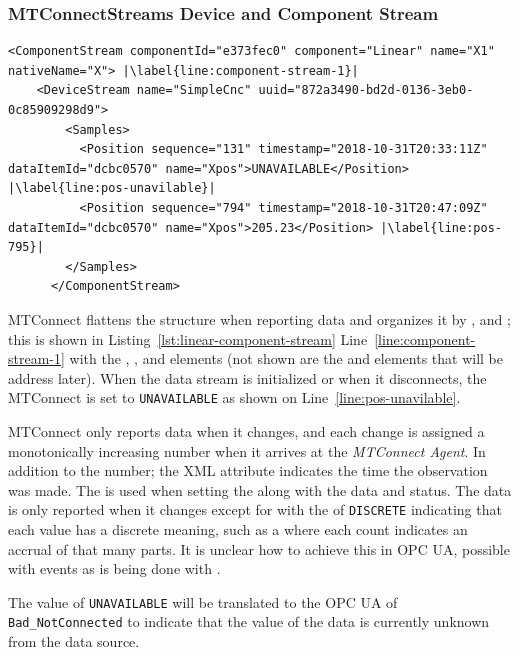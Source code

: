 \subsubsection{MTConnectStreams Device and Component Stream}

\begin{lstlisting}[firstnumber=last,escapechar=|,%
    caption={Component Stream},label={lst:component-stream}]
      <ComponentStream componentId="e373fec0" component="Linear" name="X1" nativeName="X"> |\label{line:component-stream-1}|
    <DeviceStream name="SimpleCnc" uuid="872a3490-bd2d-0136-3eb0-0c85909298d9">    
        <Samples>
          <Position sequence="131" timestamp="2018-10-31T20:33:11Z" dataItemId="dcbc0570" name="Xpos">UNAVAILABLE</Position> |\label{line:pos-unavilable}|
          <Position sequence="794" timestamp="2018-10-31T20:47:09Z" dataItemId="dcbc0570" name="Xpos">205.23</Position> |\label{line:pos-795}|
        </Samples>
      </ComponentStream>
\end{lstlisting}

MTConnect flattens the structure when reporting data and organizes it by ,  and ; this is shown in  Listing~\ref{lst:linear-component-stream} Line~\ref{line:component-stream-1} with the , , and  elements (not shown are the  and  elements that will be address later). When the data stream is initialized or when it disconnects, the MTConnect  is set to \texttt{UNAVAILABLE} as shown on Line~\ref{line:pos-unavilable}.

MTConnect only reports data when it changes, and each change is assigned a monotonically increasing  number when it arrives at the \textit{MTConnect Agent}. In addition to the  number; the XML attribute  indicates the time the observation was made. The  is used when setting the   along with the data and status. The data is only reported when it changes except for  with the  of \texttt{DISCRETE} indicating that each value has a discrete meaning, such as a  where each count indicates an accrual of that many parts. {\color{red} It is unclear how to achieve this in OPC UA, possible with events as is being done with }.

The value of \texttt{UNAVAILABLE} will be translated to the OPC UA   of \texttt{Bad_NotConnected} to indicate that the value of the data is currently unknown from the data source. 

